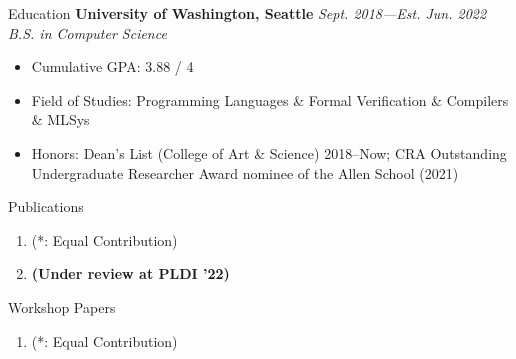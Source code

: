 \documentclass{resume}
\begin{document}
	\begin{rSection}{Education}
	{\bf University of Washington, Seattle} \hfill {\em Sept. 2018---Est. Jun. 2022} \\
	\textit{B.S. in Computer Science}
	\vspace{-5pt}
        \begin{itemize}[leftmargin=*]
            \setlength{\itemsep}{1pt}
            \setlength{\parskip}{0pt}
			\setlength{\parsep}{0pt}
			\item Cumulative GPA: 3.88 / 4
            \item Field of Studies: Programming Languages \& Formal Verification \& Compilers \& MLSys
            \item Honors: Dean's List (College of Art \& Science) 2018--Now; CRA Outstanding Undergraduate Researcher Award nominee of the Allen School (2021)
		\end{itemize}
	\end{rSection}
	\vspace{-5pt}
    \begin{rSection}{Publications}
		\begin{enumerate}
			\setlength{\itemsep}{1pt}
            \setlength{\parskip}{0pt}
			\setlength{\parsep}{0pt}
			\item {} (\small{*: Equal Contribution})
			\item \textbf{(Under review at PLDI '22)} 
		\end{enumerate}
        \vspace{-5pt}
	\end{rSection}
	\vspace{1pt}
	\begin{rSection}{Workshop Papers}
		\begin{enumerate}
			\setlength{\itemsep}{1pt}
            \setlength{\parskip}{0pt}
			\setlength{\parsep}{0pt}
			\item {} (\small{*: Equal Contribution})
		\end{enumerate}
        \vspace{-5pt}
	\end{rSection}
    \vspace{1pt}
\end{document}
